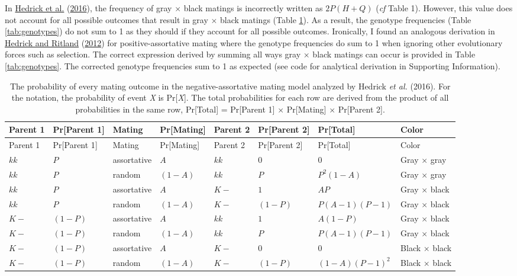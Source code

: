 \documentclass[
]{article}
\begin{document}
In \protect\hyperlink{ref-hedrick_negative-assortative_2016}{Hedrick et al.} (\protect\hyperlink{ref-hedrick_negative-assortative_2016}{2016}), the frequency of gray \(\times\) black matings is incorrectly written as \(2 P (H + Q)\) (\emph{cf} Table 1). However, this value does not account for all possible outcomes that result in gray \(\times\) black matings (Table \ref{tab:probabilities}). As a result, the genotype frequencies (Table \ref{tab:genotypes}) do not sum to 1 as they should if they account for all possible outcomes. Ironically, I found an analogous derivation in \protect\hyperlink{ref-hedrick_population_2012}{Hedrick and Ritland} (\protect\hyperlink{ref-hedrick_population_2012}{2012}) for positive-assortative mating where the genotype frequencies do sum to 1 when ignoring other evolutionary forces such as selection. The correct expression derived by summing all ways gray \(\times\) black matings can occur is provided in Table \ref{tab:genotypes}. The corrected genotype frequencies sum to 1 as expected (see code for analytical derivation in Supporting Information).

\begin{longtable}[]{@{}llllllll@{}}
\caption{\label{tab:probabilities}The probability of every mating outcome in the negative-assortative mating model analyzed by Hedrick \emph{et al.} (2016). For the notation, the probability of event \emph{X} is Pr{[}\emph{X}{]}. The total probabilities for each row are derived from the product of all probabilities in the same row, Pr{[}Total{]} = Pr{[}Parent 1{]} \(\times\) Pr{[}Mating{]} \(\times\) Pr{[}Parent 2{]}.}\tabularnewline
\toprule
Parent 1 & Pr{[}Parent 1{]} & Mating & Pr{[}Mating{]} & Parent 2 & Pr{[}Parent 2{]} & Pr{[}Total{]} & Color \\
\midrule
\endfirsthead
\toprule
Parent 1 & Pr{[}Parent 1{]} & Mating & Pr{[}Mating{]} & Parent 2 & Pr{[}Parent 2{]} & Pr{[}Total{]} & Color \\
\midrule
\endhead
\(kk\) & \(P\) & assortative & \(A\) & \(kk\) & \(0\) & \(0\) & Gray \(\times\) gray \\
\(kk\) & \(P\) & random & \((1 - A)\) & \(kk\) & \(P\) & \(P ^ 2 (1 - A)\) & Gray \(\times\) gray \\
\(kk\) & \(P\) & assortative & \(A\) & \(K-\) & \(1\) & \(A P\) & Gray \(\times\) black \\
\(kk\) & \(P\) & random & \((1 - A)\) & \(K-\) & \((1 - P)\) & \(P (A - 1) (P - 1)\) & Gray \(\times\) black \\
\(K-\) & \((1 - P)\) & assortative & \(A\) & \(kk\) & \(1\) & \(A (1 - P)\) & Gray \(\times\) black \\
\(K-\) & \((1 - P)\) & random & \((1 - A)\) & \(kk\) & \(P\) & \(P (A - 1) (P - 1)\) & Gray \(\times\) black \\
\(K-\) & \((1 - P)\) & assortative & \(A\) & \(K-\) & \(0\) & \(0\) & Black \(\times\) black \\
\(K-\) & \((1 - P)\) & random & \((1 - A)\) & \(K-\) & \((1 - P)\) & \((1 - A) (P - 1) ^ 2\) & Black \(\times\) black \\
\bottomrule
\end{longtable}
\end{document}
